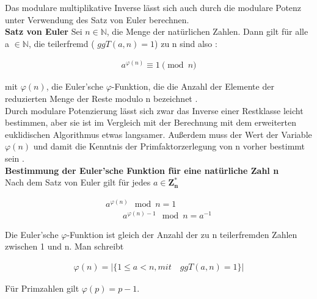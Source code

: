 Das modulare multiplikative Inverse lässt sich auch durch die modulare Potenz unter Verwendung des Satz von Euler berechnen. \\
\textbf{Satz von Euler}
Sei \(n \in \mathbb{N}\), die Menge der natürlichen Zahlen. Dann gilt
für alle a \(\in \mathbb{N}\), die teilerfremd ( $ ggT(a, n) = 1 $) zu n sind also \cite{langMIE}: \\

\begin{ceqn}
\begin{align*}
            a^{\varphi(n)} \equiv 1 \pmod n
\end{align*}
\end{ceqn}
mit $ \varphi(n)$, die Euler’sche $\varphi$-Funktion, die die Anzahl der Elemente der
reduzierten Menge der Reste modulo n bezeichnet \cite{damer}. \\

Durch modulare Potenzierung lässt sich zwar das Inverse einer Restklasse
leicht bestimmen, aber sie ist im Vergleich mit der Berechnung mit dem
erweiterten euklidischen Algorithmus etwas langsamer. Außerdem muss der Wert der Variable \(\varphi(n)\) und damit die Kenntnis der Primfaktorzerlegung von n vorher bestimmt sein \cite{langMIE}.
\\

\textbf{Bestimmung der Euler'sche Funktion für eine natürliche Zahl n } \\

Nach dem Satz von Euler gilt für jedes \(a \in \mathbf{Z^*_n} \)\\

\begin{ceqn}
\begin{align*}
            a^{\varphi(n)} \mod n = 1 \\
    \qquad  a^{\varphi(n) - 1} \mod n = a^{-1}
\end{align*}
\end{ceqn}

Die Euler'sche $\varphi$-Funktion ist gleich der Anzahl der zu n
teilerfremden Zahlen zwischen 1 und n. Man schreibt \\

\begin{ceqn}
\begin{align*}
         \varphi(n) = |\{ 1 \leq a < n, mit \quad ggT(a, n) = 1 \}|
\end{align*}
\end{ceqn}

Für Primzahlen gilt \(\varphi(p) = p - 1 \). \\


